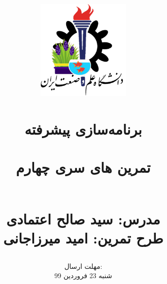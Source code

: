 \title{
    \center
    \includegraphics[width=5cm, height=5cm]{images/IUST_logo_nowrooz_color.png} \\
    \textsc{} \\
    [25pt] 
    
برنامه‌سازی پیشرفته\\
\\تمرین های سری چهارم

 \textsc{\rl{}} \\

مدرس: سید صالح اعتمادی \\

طرح تمرین: امید میرزاجانی
}
\author{
\selectfont
}
\date{
    مهلت ارسال:\\
شنبه 23 فروردین 99
}